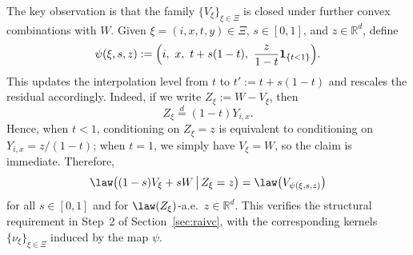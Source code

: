 \documentclass[mnsc,nonblindrev]{informs3}
\begin{document}
The key observation is that the family \(\{V_\xi\}_{\xi\in\Xi}\) is closed under further convex combinations with \(W\). Given \(\xi=(i,x,t,y)\in\Xi\), \(s\in[0,1]\), and \(z\in\mathbb{R}^d\), define \[ \psi(\xi,s,z) := \Bigl(i,\ x,\ t+s(1-t),\ \frac{z}{1-t}\mathbf{1}_{\{t<1\}}\Bigr). \] This updates the interpolation level from \(t\) to \(t':=t+s(1-t)\) and rescales the residual accordingly. Indeed, if we write \(Z_\xi:=W-V_\xi\), then \[ Z_\xi\stackrel{d}{=}(1-t)Y_{i,x}. \] Hence, when \(t<1\), conditioning on \(Z_\xi=z\) is equivalent to conditioning on \(Y_{i,x}=z/(1-t)\); when \(t=1\), we simply have \(V_\xi=W\), so the claim is immediate. Therefore, \[ \law\bigl((1-s)V_\xi+sW \,\big|\, Z_\xi=z\bigr) = \law\bigl(V_{\psi(\xi,s,z)}\bigr) \] for all \(s\in[0,1]\) and for \(\law(Z_\xi)\)-a.e.\ \(z\in\mathbb{R}^d\). This verifies the structural requirement in Step~2 of Section~\ref{sec:raivc}, with the corresponding kernels \(\{\nu_\xi\}_{\xi\in\Xi}\) induced by the map \(\psi\). 
\end{document}
